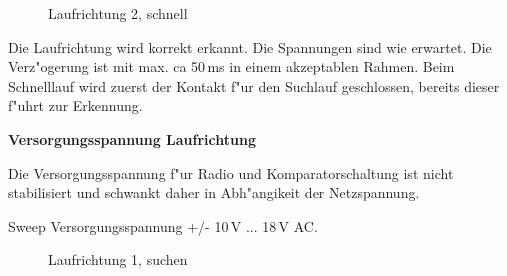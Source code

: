 \documentclass[ngerman,11pt,parskip=half] {scrartcl}
\newcommand {\tscopesize}{12cm}
\begin{document}
\begin{figure}[H]
\centering
{}
\caption{Laufrichtung 2, schnell} \label{fig:1}
\end{figure}

Die Laufrichtung wird korrekt erkannt. Die Spannungen sind wie erwartet. Die Verz"ogerung ist mit max. ca 50\,ms in einem akzeptablen Rahmen. Beim Schnelllauf wird zuerst der Kontakt f"ur den Suchlauf geschlossen, bereits dieser f"uhrt zur Erkennung.

\textbf{Versorgungsspannung Laufrichtung}

Die Versorgungsspannung f"ur Radio und Komparatorschaltung ist nicht stabilisiert und schwankt daher in Abh"angikeit der Netzspannung.

Sweep Versorgungsspannung +/- 10\,V ... 18\,V AC. 

\begin{figure}[H]
\centering
{}
\caption{Laufrichtung 1, suchen} \label{fig:1}
\end{figure}
\end{document}
